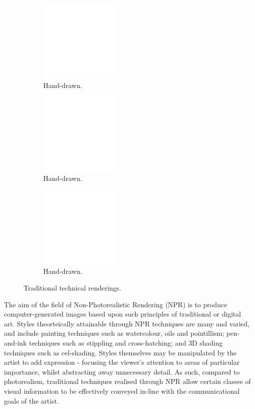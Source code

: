 \begin{figure}[h]
	\centering
	\begin{subfigure}[b]{0.3\textwidth}
		\includegraphics[height=4cm, draft]{images/placeholder}
		\caption{Hand-drawn.}\label{ex_hand_drawn1}
	\end{subfigure}
	\begin{subfigure}[b]{0.3\textwidth}
		\includegraphics[height=4cm, draft]{images/placeholder}
		\caption{Hand-drawn.}\label{ex_hand_drawn2}
	\end{subfigure}
	\begin{subfigure}[b]{0.3\textwidth}
		\includegraphics[height=4cm, draft]{images/placeholder}
		\caption{Hand-drawn.}\label{ex_hand_drawn3}
	\end{subfigure}
	\caption{Traditional technical renderings.}
\end{figure}

The aim of the field of Non-Photorealistic Rendering (NPR) is to produce computer-generated images based upon such principles of traditional or digital art.
Styles theorteically attainable through NPR techniques are many and varied, and include painting techniques such as watercolour, oils and pointillism; pen-and-ink techniques such as stippling and cross-hatching; and 3D shading techniques such as cel-shading.
Styles themselves may be manipulated by the artist to add expression - focusing the viewer's attention to areas of particular importance, whilst abstracting away unnecessary detail.
As such, compared to photorealism, traditional techniques realised through NPR allow certain classes of visual information to be effectively conveyed in-line with the communicational goals of the artist.

